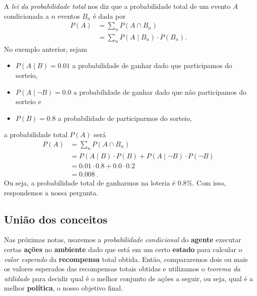 \documentclass{article}
\begin{document}
                A \emph{lei da probabilidade total} nos diz que a probabilidade total de um evento $A$ condicionada a $n$ eventos $B_n$ é dada por
                \begin{equation}
                \begin{aligned}
                    P(A) & = \sum_{n}{P(A \cap B_n)} \\
                    & = \sum_{n}{P(A \mid B_n) \cdot P(B_n)}.
                \end{aligned}
                \end{equation}
                No exemplo anterior, sejam 
                \begin{itemize}
                    \item $P(A \mid B) = 0.01$ a probabilidade de ganhar dado que participamos do sorteio,
                    \item $P(A \mid \lnot B) = 0.0$ a probabilidade de ganhar dado que não participamos do sorteio e
                    \item $P(B) = 0.8$ a probabilidade de participarmos do sorteio,
                \end{itemize}
                a probabilidade total $P(A)$ será
                \begin{equation*}
                \begin{aligned}
                    P(A) & = \sum_{n}{P(A \cap B_n)}\\
                    & = P(A \mid B) \cdot P(B) + P(A \mid \lnot B) \cdot P(\lnot B)\\
                    & = 0.01 \cdot 0.8 + 0.0 \cdot 0.2\\
                    & = 0.008\ .
                \end{aligned}
                \end{equation*}
                Ou seja, a probabilidade total de ganharmos na loteria é $0.8\%$. Com isso, respondemos a nossa pergunta.
            
        \subsection{União dos conceitos}
                
            Nas próximas notas, usaremos a \emph{probabilidade condicional} do \textbf{agente} executar certas \textbf{ações} no \textbf{ambiente} dado que está em um certo \textbf{estado} para calcular o \emph{valor esperado} da \textbf{recompensa} total obtida. Então, compararemos dois ou mais os valores esperados das recompensas totais obtidas e utilizamos o \emph{teorema da utilidade} para decidir qual é o melhor conjunto de ações a seguir, ou seja, qual é a melhor \textbf{política}, o nosso objetivo final.
            
    \printbibliography
    
\end{document}

